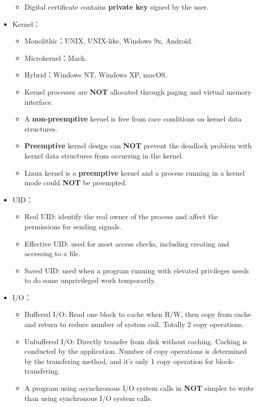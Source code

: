 \begin{itemize}
\begin{itemize}
\begin{itemize}
        \end{itemize}
        \item Digital certificate contains \textbf{private key} signed by the user.
    \end{itemize}
    \item Kernel：\begin{itemize}
        \item Monolithic：UNIX, UNIX-like, Windows 9x, Android.
        \item Microkernel：Mach.
        \item Hybrid：Windows NT, Windows XP, macOS.
        \item Kernel processes are \textbf{NOT} allocated through paging and virtual memory interface.
        \item A \textbf{non-preemptive} kernel is free from race conditions on kernel data structures.
        \item \textbf{Preemptive} kernel design can \textbf{NOT} prevent the deadlock problem with kernel data structures from occurring in the kernel.
        \item Linux kernel is a \textbf{preemptive} kernel and a process running in a kernel mode could \textbf{NOT} be preempted.
    \end{itemize}
    \item UID：\begin{itemize}
        \item Real UID: identify the real owner of the process and affect the permissions for sending signals.
        \item Effective UID: used for most access checks, including creating and accessing to a file.
        \item Saved UID: used when a program running with elevated privileges needs to do some unprivileged work temporarily.
    \end{itemize}
    \item I/O：\begin{itemize}
        \item Buffered I/O: Read one block to cache when R/W, then copy from cache and return to reduce number of system call. Totally 2 copy operations.
        \item Unbuffered I/O: Directly transfer from disk without caching. Caching is conducted by the application. Number of copy operations is determined by the transfering method, and it's only 1 copy operation for block-transfering. 
        \item A program using asynchronous I/O system calls in \textbf{NOT} simpler to write than using synchronous I/O system calls.

\end{itemize}
\end{itemize}
